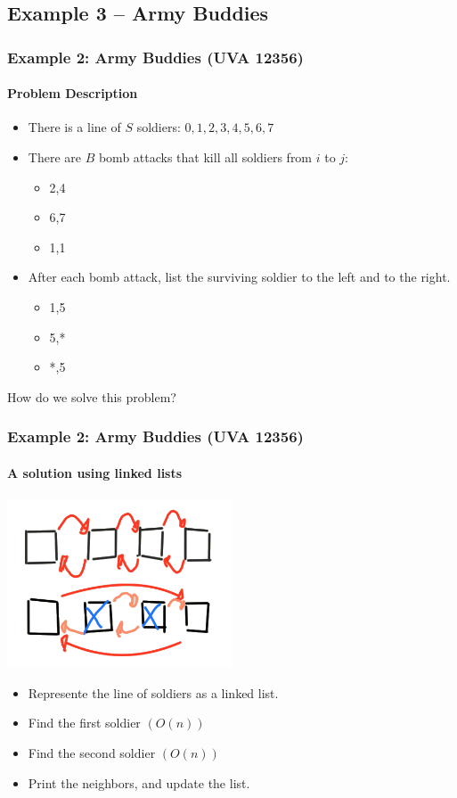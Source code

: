 \documentclass{beamer}
\begin{document}
\subsection{Example 3 -- Army Buddies}

\begin{frame}
  \frametitle{Example 2: Army Buddies (UVA 12356)}
  \framesubtitle{Problem Description}

  \begin{block}{}
    \begin{itemize}
    \item There is a line of $S$ soldiers: $0,1,2,3,4,5,6,7$
    \item There are $B$ bomb attacks that kill all soldiers from $i$ to $j$:
      \begin{itemize}
      \item 2,4
      \item 6,7
      \item 1,1
      \end{itemize}
    \item After each bomb attack, list the surviving soldier to the
      \alert{left} and to the \alert{right}.
      \begin{itemize}
      \item 1,5
      \item 5,*
      \item *,5
      \end{itemize}
    \end{itemize}
  \end{block}

  \bigskip

  How do we solve this problem?
\end{frame}

\begin{frame}
  \frametitle{Example 2: Army Buddies (UVA 12356)}
  \framesubtitle{A solution using linked lists}

  \begin{center}
    \includegraphics[width=0.5\textwidth]{img/army-list}
  \end{center}

  \begin{itemize}
  \item Represente the line of soldiers as a linked list.
  \item Find the first soldier $(O(n))$
  \item Find the second soldier $(O(n))$
  \item Print the neighbors, and update the list.
  \end{itemize}
  \bigskip
  
\end{frame}
\end{document}
